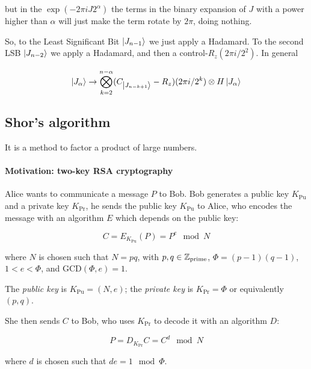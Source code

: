 \documentclass[main.tex]{subfiles}
\begin{document}
but in the \(\exp(-2 \pi i J 2^\alpha) \) the terms in the binary expansion of \(J\) with a power higher than \(\alpha\) will just make the term rotate by \(2 \pi \), doing nothing.

So, to the Least Significant Bit \(\ket{J_{n-1}}\) we just apply a Hadamard. To the second LSB \(\ket{J_{n-2}} \) we apply a Hadamard, and then a control-\(R_z(2 \pi i / 2^2)\). In general

\begin{equation}
    \ket{J_\alpha} \rightarrow  \bigotimes_{k=2}^{n-\alpha} (C_{\ket{J_{n-k+1}}} - R_z)(2 \pi i / 2^{k}) \otimes H \ket{J_\alpha}
\end{equation}

\subsection{Shor's algorithm}

It is a method to factor a product of large numbers.

\paragraph{Motivation: two-key RSA cryptography}

Alice wants to communicate a message \(P\) to Bob.
Bob generates a public key \( K _{\text{Pu}} \) and a private key \( K _{\text{Pr}}  \), he sends the public key \( K _{\text{Pu}} \) to Alice, who encodes the message with an algorithm \(E\) which depends on the public key:

\begin{equation}
  C = E _{K _{\text{Pu}} } (P) = P ^e \mod N
\end{equation}

where \( N \) is chosen such that \( N = pq \), with \( p, q \in \mathbb{Z}_{\text{prime}} \), \(\Phi = (p-1) (q-1)\), \( 1<e<\Phi \),  and \( \text{GCD}(\Phi, e) = 1 \).

The \emph{public key} is  \(K _{\text{Pu}} = (N, e)\); the \emph{private key} is \(K _{\text{Pr}} = \Phi\) or equivalently \((p, q)\).

She then sends \( C \) to Bob, who uses \( K _{\text{Pr}} \) to decode it with an algorithm \(D\):

\begin{equation}
  P = D _{K _{\text{Pr}}} C =  C^d \mod N
\end{equation}

where \( d \) is chosen such that \( de = 1 \mod \Phi \).
\end{document}
